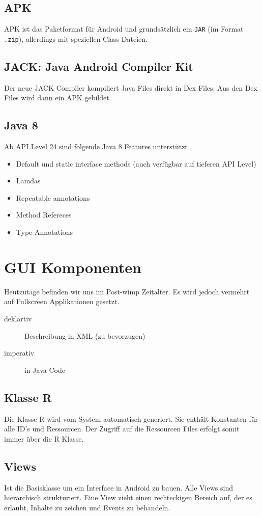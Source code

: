 \subsection{APK}
APK ist das Paketformat für Android und grundsätzlich ein \lstinline|JAR| (im Format \lstinline|.zip|), allerdings mit speziellen Class-Dateien.

\subsection{JACK: Java Android Compiler Kit}
Der neue JACK Compiler kompiliert Java Files direkt in Dex Files. Aus den Dex Files wird dann ein APK gebildet.

\subsection{Java 8}
Ab API Level 24 sind folgende Java 8 Features unterstützt
\begin{itemize}
	\item Default und static interface methods (auch verfügbar auf tieferen API Level)
	\item Lamdas
	\item Repeatable annotations
	\item Method Refereces
	\item Type Annotations
\end{itemize}

\section{GUI Komponenten}
Heutzutage befinden wir uns im Post-\gls{wimp} Zeitalter. Es wird jedoch vermehrt auf Fullscreen Applikationen gesetzt.
\begin{description}
	\item[deklartiv] Beschreibung in XML (zu bevorzugen)
	\item[imperativ] in Java Code
\end{description}

\subsection{Klasse R}
Die Klasse R wird vom System automatisch generiert. Sie enthält Konstanten für alle ID's und Ressourcen. Der Zugriff auf die Ressourcen Files erfolgt somit immer über die R Klasse. 

\subsection{Views}
Ist die Basisklasse um ein Interface in Android zu bauen. Alle Views sind hierarchisch strukturiert. Eine View zieht einen rechteckigen Bereich auf, der es erlaubt, Inhalte zu zeichen und Events zu behandeln.

